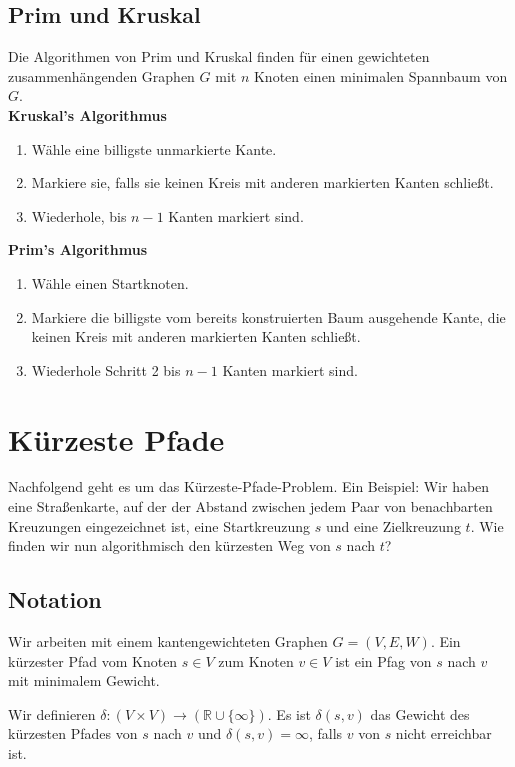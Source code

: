 \documentclass[12pt]{article}
\begin{document}
\subsection{Prim und Kruskal}

Die Algorithmen von Prim und Kruskal finden für einen gewichteten zusammenhängenden Graphen $G$ mit $n$ Knoten einen minimalen Spannbaum von $G$.\\

\textbf{Kruskal's Algorithmus}

\begin{enumerate}
\item Wähle eine billigste unmarkierte Kante.
\item Markiere sie, falls sie keinen Kreis mit anderen markierten Kanten schließt.
\item Wiederhole, bis $n-1$ Kanten markiert sind.
\end{enumerate}

\textbf{Prim's Algorithmus}

\begin{enumerate}
\item Wähle einen Startknoten.
\item Markiere die billigste vom bereits konstruierten Baum ausgehende Kante, die keinen Kreis mit anderen markierten Kanten schließt.
\item Wiederhole Schritt 2 bis $n-1$ Kanten markiert sind.
\end{enumerate}

\section{Kürzeste Pfade}

Nachfolgend geht es um das Kürzeste-Pfade-Problem. Ein Beispiel: Wir haben eine Straßenkarte, auf der der Abstand zwischen jedem Paar von benachbarten Kreuzungen eingezeichnet ist, eine Startkreuzung $s$ und eine Zielkreuzung $t$. Wie finden wir nun algorithmisch den kürzesten Weg von $s$ nach $t$?

\subsection{Notation}

Wir arbeiten mit einem kantengewichteten Graphen $G = (V, E, W)$. Ein kürzester Pfad vom Knoten $s \in V$ zum Knoten $v \in V$ ist ein Pfag von $s$ nach $v$ mit minimalem Gewicht.

Wir definieren $\delta: (V \times V) \rightarrow (\mathbb{R} \cup \{\infty\})$. Es ist $\delta(s, v)$ das Gewicht des kürzesten Pfades von $s$ nach $v$ und $\delta(s, v) = \infty$, falls $v$ von $s$ nicht erreichbar ist.
\end{document}
